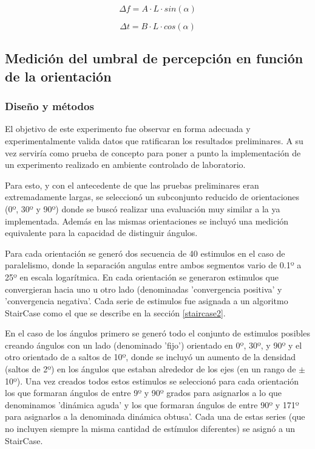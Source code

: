 \documentclass{article}
\begin{document}
    
    \begin{equation} \label{ec:DeltaF}
        \Delta f = A \cdot L \cdot sin (\alpha)
    \end{equation}
        
    \begin{equation} \label{ec:DeltaT}
        \Delta t = B \cdot L \cdot cos (\alpha)
    \end{equation}

    \subsection{Medición del umbral de percepción en función de la orientación} \label{seccion:Exp1}
    
    \subsubsection{Diseño y métodos}
    
    El objetivo de este experimento fue observar en forma adecuada y experimentalmente valida datos que ratificaran los resultados preliminares. A su vez serviría como prueba de concepto para poner a punto la implementación de un experimento realizado en ambiente controlado de laboratorio.
    
    Para esto, y con el antecedente de que las pruebas preliminares eran extremadamente largas, se seleccionó un subconjunto reducido de orientaciones (0º, 30º y 90º) donde se buscó realizar una evaluación muy similar a la ya implementada. Además en las mismas orientaciones se incluyó una medición equivalente para la capacidad de distinguir ángulos. 
    
    Para cada orientación se generó dos secuencia de 40 estimulos en el caso de paralelismo, donde la separación angulas entre ambos segmentos vario de 0.1º a 25º en escala logarítmica. En cada orientación se generaron estimulos que convergieran hacia uno u otro lado (denominadas 'convergencia positiva' y 'convergencia negativa'. Cada serie de estimulos fue asignada a un algoritmo StairCase como el que se describe en la sección \ref{staircase2}. 
    
    En el caso de los ángulos primero se generó todo el conjunto de estimulos posibles creando ángulos con un lado (denominado 'fijo') orientado en 0º, 30º, y 90º y el otro orientado de a saltos de 10º, donde se incluyó un aumento de la densidad (saltos de 2º) en los ángulos que estaban alrededor de los ejes (en un rango de $\pm$ 10º). Una vez creados todos estos estimulos se seleccionó para cada orientación los que formaran ángulos de entre 9º y 90º grados para asignarlos a lo que denominamos 'dinámica aguda' y los que formaran ángulos de entre 90º y 171º para asignarlos a la denominada dinámica obtusa'. Cada una de estas series (que no incluyen siempre la misma cantidad de estímulos diferentes) se asignó a un StairCase. 
    
\end{document}
